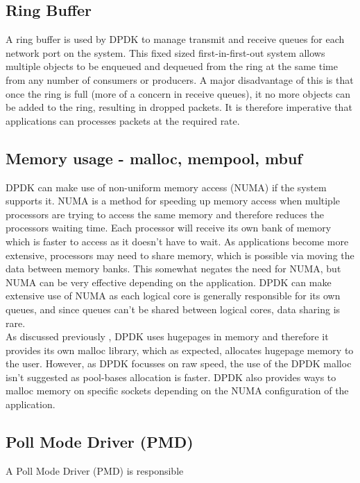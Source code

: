 \documentclass[final_report.tex]{subfiles}
\begin{document}
\subsection{Ring Buffer}
A ring buffer is used by DPDK to manage transmit and receive queues for each network port on the system. This fixed sized first-in-first-out system allows multiple objects to be enqueued and dequeued from the ring at the same time from any number of consumers or producers. A major disadvantage of this is that once the ring is full (more of a concern in receive queues), it no more objects can be added to the ring, resulting in dropped packets. It is therefore imperative that applications can processes packets at the required rate.

\subsection{Memory usage - malloc, mempool, mbuf}
DPDK can make use of non-uniform memory access (NUMA) if the system supports it. NUMA is a method for speeding up memory access when multiple processors are trying to access the same memory and therefore reduces the processors waiting time. Each processor will receive its own bank of memory which is faster to access as it doesn't have to wait. As applications become more extensive, processors may need to share memory, which is possible via moving the data between memory banks. This somewhat negates the need for NUMA, but NUMA can be very effective depending on the application. DPDK can make extensive use of NUMA as each logical core is generally responsible for its own queues, and since queues can't be shared between logical cores, data sharing is rare. \\
\newline
As discussed previously , DPDK uses hugepages in memory and therefore it provides its own malloc library, which as expected, allocates hugepage memory to the user. However, as DPDK focusses on raw speed, the use of the DPDK malloc isn't suggested as pool-bases allocation is faster. DPDK also provides ways to malloc memory on specific sockets depending on the NUMA configuration of the application. \\


\subsection{Poll Mode Driver (PMD)}
A Poll Mode Driver (PMD) is responsible 
\end{document}
